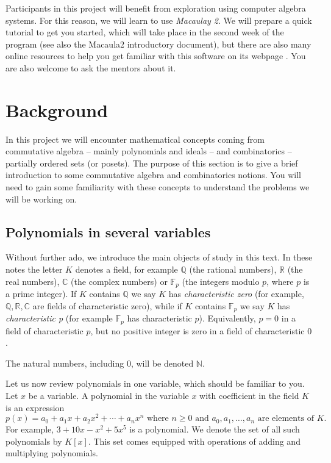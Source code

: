 \documentclass[11pt]{amsart}
\newcommand{\C}{{\mathbb C}}
\newcommand{\F}{{\mathbb F}}
\newcommand{\N}{{\mathbb N}}
\newcommand{\R}{{\mathbb R}}
\newcommand{\Q}{{\mathbb Q}}
\theoremstyle{plain} %
\theoremstyle{definition}
\theoremstyle{remark}
\numberwithin{equation}{section}  %
\begin{document}
Participants in this project will benefit from exploration using computer algebra systems. For this reason, we will learn to use {\em Macaulay 2}. We will prepare a quick tutorial to get you started, which will take place in the second week of the program (see also the Macaula2 introductory document),  but there are also many online resources to help you get familiar with this software on its webpage  \cite{M2}. You are also welcome to ask the mentors about it. 

\section{Background}
\label{s:background}

In this project we will encounter mathematical concepts coming from commutative algebra -- mainly polynomials and ideals -- and combinatorics -- partially ordered sets (or posets). The purpose of this section is to give a brief introduction to some commutative algebra and combinatorics notions. You will need to gain some familiarity with these concepts to understand the problems we will be working on. 

\subsection{Polynomials in several variables}

Without further ado, we introduce the main objects of study in this text. In these notes the letter $K$ denotes a field, for example $\Q$ (the rational numbers), $\R$ (the real numbers), $\C$ (the complex numbers) or $\F_p$ (the integers modulo $p$, where $p$ is a prime integer). If $K$ contains $\Q$ we say $K$ has {\em characteristic zero} (for example, $\Q, \R, \C$ are fields of characteristic zero), while if $K$ contains $\F_p$ we say $K$ has {\em characteristic p} (for example $\F_p$ has characteristic $p$). Equivalently, $p=0$ in a field of characteristic $p$, but no positive integer is zero in a field of characteristic $0$.

The natural numbers, including 0, will be denoted $\N$.

Let us now review polynomials in one variable, which should be familiar to you. Let $x$ be a variable. A polynomial in the variable $x$ with coefficient in the field $K$ is an expression 
\[
p(x)=a_0+a_1x+a_2x^2+ \cdots + a_nx^n \text{ where }n\geq 0 \text{ and } a_0, a_1, \ldots, a_n \text{ are elements of }K.
\]
For example, $3+10x-x^2+5x^5$ is a polynomial.
We denote the set of all such polynomials by $K[x]$. This set comes equipped with operations of  adding and multiplying polynomials. %
\end{document}
